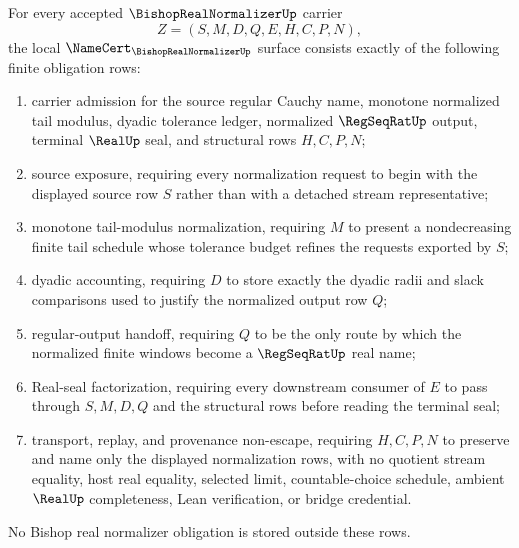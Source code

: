 \begin{theorem}
\label{thm:bishop-real-normalizer-namecert-obligations}
For every accepted $\BishopRealNormalizerUp$ carrier
$$
Z=(S,M,D,Q,E,H,C,P,N),
$$
the local $\NameCert_{\BishopRealNormalizerUp}$ surface consists exactly of the following finite obligation rows:
\begin{enumerate}
\item carrier admission for the source regular Cauchy name, monotone normalized tail modulus, dyadic tolerance ledger, normalized $\RegSeqRatUp$ output, terminal $\RealUp$ seal, and structural rows $H,C,P,N$;
\item source exposure, requiring every normalization request to begin with the displayed source row $S$ rather than with a detached stream representative;
\item monotone tail-modulus normalization, requiring $M$ to present a nondecreasing finite tail schedule whose tolerance budget refines the requests exported by $S$;
\item dyadic accounting, requiring $D$ to store exactly the dyadic radii and slack comparisons used to justify the normalized output row $Q$;
\item regular-output handoff, requiring $Q$ to be the only route by which the normalized finite windows become a $\RegSeqRatUp$ real name;
\item Real-seal factorization, requiring every downstream consumer of $E$ to pass through $S,M,D,Q$ and the structural rows before reading the terminal seal;
\item transport, replay, and provenance non-escape, requiring $H,C,P,N$ to preserve and name only the displayed normalization rows, with no quotient stream equality, host real equality, selected limit, countable-choice schedule, ambient $\RealUp$ completeness, Lean verification, or bridge credential.
\end{enumerate}
No Bishop real normalizer obligation is stored outside these rows.
\end{theorem}
